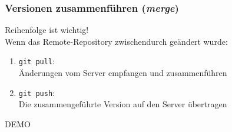 \documentclass[accentcolor=tud8b,colorbacktitle,inverttitle,landscape,german,presentation,t]{tudbeamer}
\newcommand{\diffn}[1]{\textcolor{darkgreen}{#1}}
\begin{document}
\begin{frame}
			\end{frame}
		
			\begin{frame}
				\frametitle{Versionen zusammenführen (\textit{merge})}
				Reihenfolge ist wichtig!\\ Wenn das Remote-Repository zwischendurch geändert wurde:
				\begin{enumerate}
					\item \texttt{git pull}:\\Änderungen vom Server empfangen und zusammenführen
					\item \texttt{git push}:\\Die zusammengeführte Version auf den Server übertragen
				\end{enumerate}
			\end{frame}
		
			\begin{frame}
				DEMO
			\end{frame}
	
\end{document}
